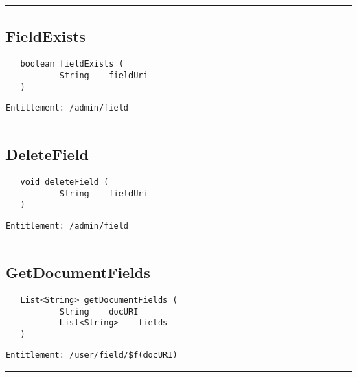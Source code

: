 \rule{12cm}{2pt}
\subsection{FieldExists}
\label{Api:FieldExists}
\begin{Verbatim}
   boolean fieldExists (
           String    fieldUri
   )
\end{Verbatim}
\begin{Verbatim}[formatcom=\color{Maroon}]
  Entitlement: /admin/field
\end{Verbatim}



\rule{12cm}{2pt}
\subsection{DeleteField}
\label{Api:DeleteField}
\begin{Verbatim}
   void deleteField (
           String    fieldUri
   )
\end{Verbatim}
\begin{Verbatim}[formatcom=\color{Maroon}]
  Entitlement: /admin/field
\end{Verbatim}



\rule{12cm}{2pt}
\subsection{GetDocumentFields}
\label{Api:GetDocumentFields}
\begin{Verbatim}
   List<String> getDocumentFields (
           String    docURI
           List<String>    fields
   )
\end{Verbatim}
\begin{Verbatim}[formatcom=\color{Maroon}]
  Entitlement: /user/field/$f(docURI)
\end{Verbatim}



\rule{12cm}{2pt}
